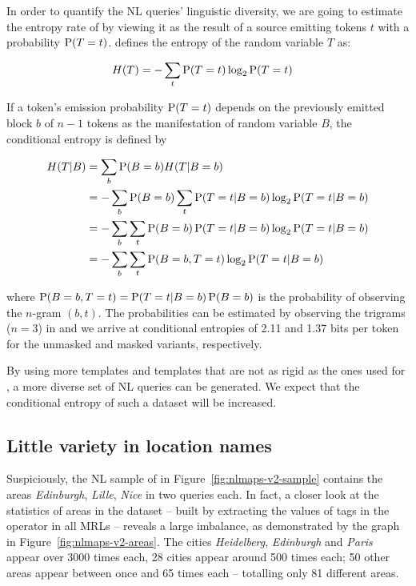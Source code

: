In order to quantify the NL queries’ linguistic diversity, we are going to
estimate the entropy rate of \nlmapstwo{} by viewing it as the result of a
source emitting tokens \(t\) with a probability \(\operatorname*{P}(T=t)\).
\textcite{shannon-1948} defines the entropy of the random variable \(T\) as:

\begin{align}
  H(T) &= - \sum_t \operatorname*{P}(T=t) \log_2 \operatorname*{P}(T=t)
\end{align}

If a token’s emission probability \(\operatorname*{P}(T=t)\) depends on the previously emitted
block \(b\) of \(n-1\) tokens as the manifestation of random variable \(B\), the
conditional entropy is defined by

\begin{align}
  H(T|B) &= \sum_b \operatorname*{P}(B=b) H(T|B=b)\\
         &= - \sum_b \operatorname*{P}(B=b) \sum_t \operatorname*{P}(T=t|B=b) \log_2 \operatorname*{P}(T=t|B=b)\\
         &= - \sum_b \sum_t \operatorname*{P}(B=b) \operatorname*{P}(T=t|B=b) \log_2 \operatorname*{P}(T=t|B=b)\\
         &= - \sum_b \sum_t \operatorname*{P}(B=b, T=t) \log_2 \operatorname*{P}(T=t|B=b)
\end{align}

where \(\operatorname*{P}(B=b, T=t) = \operatorname*{P}(T=t|B=b) \operatorname*{P}(B=b)\) is the probability of observing the
\(n\)-gram \((b, t)\). The probabilities can be estimated by observing the
trigrams (\(n=3\)) in \nlmapstwo{} and we arrive at conditional entropies of
\num{2.11} and \num{1.37} bits per token for the unmasked and masked variants,
respectively.

By using more templates and templates that are not as rigid as the ones used for
\nlmapstwo{}, a more diverse set of NL queries can be generated. We expect that
the conditional entropy of such a dataset will be increased.

\subsection{Little variety in location names}

Suspiciously, the NL sample of \nlmapstwo{} in Figure~\ref{fig:nlmaps-v2-sample}
contains the areas \emph{Edinburgh}, \emph{Lille}, \emph{Nice} in two queries
each. In fact, a closer look at the statistics of areas in the dataset – built
by extracting the values of  tags in the  operator in
all \nlmapstwo{} MRLs – reveals a large imbalance, as demonstrated by the graph
in Figure~\ref{fig:nlmaps-v2-areas}. The cities \emph{Heidelberg},
\emph{Edinburgh} and \emph{Paris} appear over \num{3000} times each, \num{28}
cities appear around \num{500} times each; \num{50} other areas appear between
once and \num{65} times each – totalling only \num{81} different areas.

